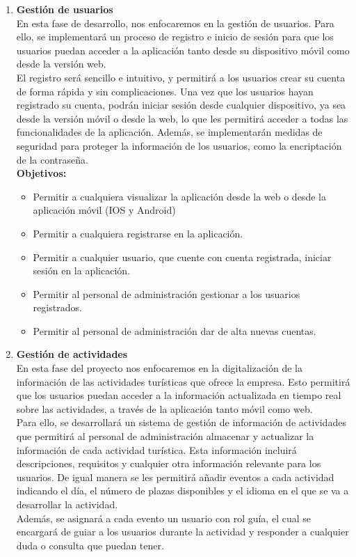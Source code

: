 \begin{enumerate}[label=\bfseries{Fase \arabic*.},leftmargin=*]
	\item {\bfseries Gestión de usuarios} \\[1ex]En esta fase de desarrollo, nos enfocaremos en la gestión de usuarios. Para ello, se implementará un proceso de registro e inicio de sesión para que los usuarios puedan acceder a la aplicación tanto desde su dispositivo móvil como desde la versión web.\\[1ex] El registro será sencillo e intuitivo, y permitirá a los usuarios crear su cuenta de forma rápida y sin complicaciones.
	      Una vez que los usuarios hayan registrado su cuenta, podrán iniciar sesión desde cualquier dispositivo, ya sea desde la versión móvil o desde la web, lo que les permitirá acceder a todas las funcionalidades de la aplicación. Además, se implementarán medidas de seguridad para proteger la información de los usuarios, como la encriptación de la contraseña.\\[1ex]
	      {\bfseries Objetivos:}
	      \begin{itemize}
		      \item Permitir a cualquiera visualizar la aplicación desde la web o desde la aplicación móvil (IOS y Android)
		      \item Permitir a cualquiera registrarse en la aplicación.
		      \item Permitir a cualquier usuario, que cuente con cuenta registrada, iniciar sesión en la aplicación.
		      \item Permitir al personal de administración gestionar a los usuarios registrados.
		      \item Permitir al personal de administración dar de alta nuevas cuentas.
	      \end{itemize}
	\item {\bfseries Gestión de actividades}\\[1ex]En esta fase del proyecto nos enfocaremos en la digitalización de la información de las actividades turísticas que ofrece la empresa. Esto permitirá que los usuarios puedan acceder a la información actualizada en tiempo real sobre las actividades, a través de la aplicación tanto móvil como web.\\[1ex]Para ello, se desarrollará un sistema de gestión de información de actividades que permitirá al personal de administración almacenar y actualizar la información de cada actividad turística. Esta información incluirá descripciones, requisitos y cualquier otra información relevante para los usuarios. De igual manera se les permitirá añadir eventos a cada actividad indicando el día, el número de plazas disponibles y el idioma en el que se va a desarrollar la actividad.\\[1ex]Además, se asignará a cada evento un usuario con rol guía, el cual se encargará de guiar a los usuarios durante la actividad y responder a cualquier duda o consulta que puedan tener.\\[1ex]

\end{enumerate}

